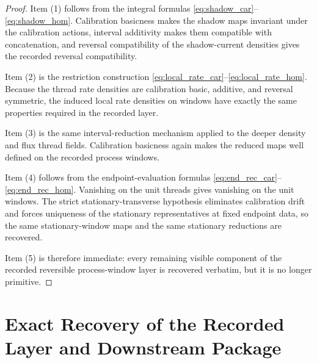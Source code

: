 \documentclass[11pt]{article}
\begin{document}
\begin{proof}
Item (1) follows from the integral formulas \eqref{eq:shadow_car}--\eqref{eq:shadow_hom}. Calibration basicness makes the shadow maps invariant under the calibration actions, interval additivity makes them compatible with concatenation, and reversal compatibility of the shadow-current densities gives the recorded reversal compatibility.

Item (2) is the restriction construction \eqref{eq:local_rate_car}--\eqref{eq:local_rate_hom}. Because the thread rate densities are calibration basic, additive, and reversal symmetric, the induced local rate densities on windows have exactly the same properties required in the recorded layer.

Item (3) is the same interval-reduction mechanism applied to the deeper density and flux thread fields. Calibration basicness again makes the reduced maps well defined on the recorded process windows.

Item (4) follows from the endpoint-evaluation formulas \eqref{eq:end_rec_car}--\eqref{eq:end_rec_hom}. Vanishing on the unit threads gives vanishing on the unit windows. The strict stationary-transverse hypothesis eliminates calibration drift and forces uniqueness of the stationary representatives at fixed endpoint data, so the same stationary-window maps and the same stationary reductions are recovered.

Item (5) is therefore immediate: every remaining visible component of the recorded reversible process-window layer is recovered verbatim, but it is no longer primitive.
\end{proof}

\section{Exact Recovery of the Recorded Layer and Downstream Package}
\end{document}
